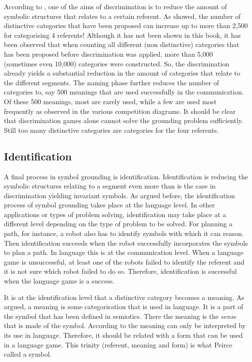 According to \citet{harnad:1990}, one of the aims of discrimination is to reduce the amount of symbolic structures that relates to a certain referent. As  showed, the number of distinctive categories that have been proposed can increase up to more than 2,500 for categorising 4 referents! Although it has not been shown in this book, it has been observed that when counting all different (non distinctive) categories that has been proposed before discrimination was applied, more than 5,000 (sometimes even 10,000) categories were constructed. So, the discrimination already yields a substantial reduction in the amount of categories that relate to the different segments. The naming phase further reduces the number of categories to, say 500 meanings that are used successfully in the communication. Of these 500 meanings, most are rarely used, while a few are used most frequently as observed in the various competition diagrams. It should be clear that  discrimination games alone cannot solve the grounding problem sufficiently. Still too many distinctive categories are categories for the four referents.

\subsection{Identification}

A final process in symbol grounding is identification. Identification is reducing the symbolic structures relating to a segment even more than is the case in discrimination yielding invariant symbols. As argued before, the identification process of symbol grounding takes place at the language level. In other applications or types of problem solving, identification may take place at a different level depending on the type of problem to be solved. For planning a path, for instance, a robot also has to identify symbols with which it can reason. Then identification succeeds when the robot successfully incorporates the symbols to plan a path. In language this is at the communication level. When a language game is unsuccessful, at least one of the robots failed to identify the referent and it is not sure which robot failed to do so. Therefore, identification is successful when the language game is a success.

It is at the identification level that a distinctive category becomes a meaning. As argued, a meaning is some categorisation that is used in language. It is a part of the symbol that has been defined in semiotics. There the meaning is the {\em sense} that is made of the symbol. According to \citet{wittgenstein:1958} the meaning can only be interpreted by its use in language. Therefore, it should be related with a form that can be used in a language game. This trinity (referent, meaning and form) is what Peirce called a symbol. 

